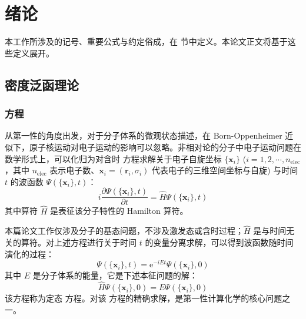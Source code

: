 
\chapter{绪论}
\label{sec.1.title}

本工作所涉及的记号、重要公式与约定俗成，在  节中定义。本论文正文将基于这些定义展开。

\section{密度泛函理论}

\subsection{\Schrodinger 方程}

从第一性的角度出发，对于分子体系的微观状态描述，在 Born-Oppenheimer 近似下\cite{Born-Oppenheimer.AP.1927}，原子核运动对电子运动的影响可以忽略。非相对论的分子中电子运动问题在数学形式上，可以化归为对含时 \Schrodinger 方程\cite{Schroedinger-Schroedinger.PR.1926}求解关于电子自旋坐标 $\{\bm{x}_i\}$ ($i = 1, 2, \cdots, n_\mathrm{elec}$，其中 $n_\mathrm{elec}$ 表示电子数、$\bm{x}_i = (\bm{r}_i, \sigma_i)$ 代表电子的三维空间坐标与自旋) 与时间 $t$ 的波函数 $\Psi(\{\bm{x}_i\}, t)$：
\begin{equation}
  i \frac{\partial \Psi(\{\bm{x}_i\}, t)}{\partial t} = \hat H \Psi(\{\bm{x}_i\}, t)
\end{equation}
其中算符 $\hat H$ 是表征该分子特性的 Hamilton 算符。

本篇论文工作仅涉及分子的基态问题，不涉及激发态或含时过程；$\hat H$ 是与时间无关的算符。对上述方程进行关于时间 $t$ 的变量分离求解，可以得到波函数随时间演化的过程：
\begin{equation}
  \Psi(\{\bm{x}_i\}, t) = \mathrm{e}^{- i E t} \Psi(\{\bm{x}_i\}, 0)
\end{equation}
其中 $E$ 是分子体系的能量，它是下述本征问题的解：
\begin{equation}
  \label{eq.1.tise}
  \hat H \Psi(\{\bm{x}_i\}, 0) = E \Psi(\{\bm{x}_i\}, 0)
\end{equation}
该方程称为定态 \Schrodinger 方程。对该 \Schrodinger 方程的精确求解，是第一性计算化学的核心问题之一。

